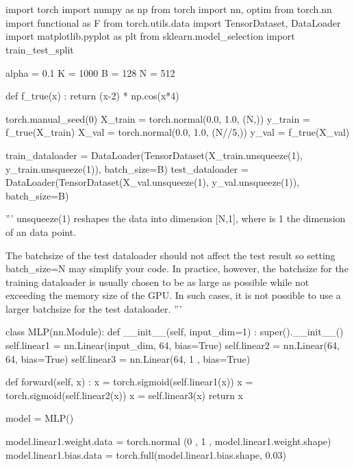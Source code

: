 \documentclass[10pt]{article}
\begin{document}
\section{}
\begin{python}
    import torch
    import numpy as np
    from torch import nn, optim
    from torch.nn import functional as F
    from torch.utils.data import TensorDataset, DataLoader
    import matplotlib.pyplot as plt
    from sklearn.model_selection import train_test_split
    
    alpha = 0.1
    K = 1000
    B = 128
    N = 512
    
    def f_true(x) :
        return (x-2) * np.cos(x*4)
    
    torch.manual_seed(0)
    X_train = torch.normal(0.0, 1.0, (N,))
    y_train = f_true(X_train)
    X_val = torch.normal(0.0, 1.0, (N//5,))
    y_val = f_true(X_val)
    
    train_dataloader = DataLoader(TensorDataset(X_train.unsqueeze(1), y_train.unsqueeze(1)), batch_size=B)
    test_dataloader = DataLoader(TensorDataset(X_val.unsqueeze(1), y_val.unsqueeze(1)), batch_size=B)
    
    '''
    unsqueeze(1) reshapes the data into dimension [N,1],
    where is 1 the dimension of an data point.
    
    The batchsize of the test dataloader should not affect the test result
    so setting batch_size=N may simplify your code.
    In practice, however, the batchsize for the training dataloader
    is usually chosen to be as large as possible while not exceeding
    the memory size of the GPU. In such cases, it is not possible to
    use a larger batchsize for the test dataloader.
    '''
    
    class MLP(nn.Module):
        def __init__(self, input_dim=1) :
            super().__init__()
            self.linear1 = nn.Linear(input_dim, 64, bias=True)
            self.linear2 = nn.Linear(64, 64, bias=True)
            self.linear3 = nn.Linear(64, 1 , bias=True)
            
        def forward(self, x) :
            x = torch.sigmoid(self.linear1(x))
            x = torch.sigmoid(self.linear2(x))
            x = self.linear3(x)
            return x
            
    model = MLP()
    
    model.linear1.weight.data = torch.normal (0 , 1 , model.linear1.weight.shape)
    model.linear1.bias.data = torch.full(model.linear1.bias.shape, 0.03)
    

\end{python}
\end{document}
